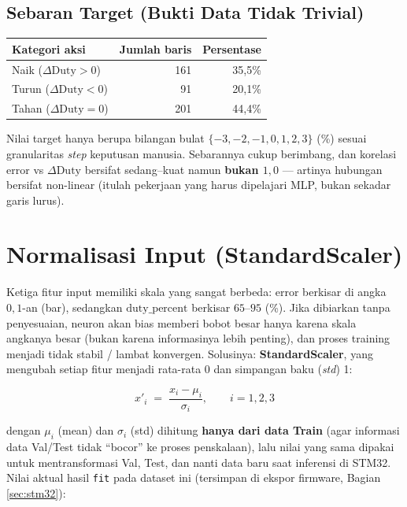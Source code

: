 \documentclass[11pt,a4paper]{article}
\begin{document}
\subsection{Sebaran Target (Bukti Data Tidak Trivial)}

\begin{center}
\begin{tabular}{@{}l r r@{}}
\toprule
\textbf{Kategori aksi} & \textbf{Jumlah baris} & \textbf{Persentase} \\
\midrule
Naik ($\Delta\mathrm{Duty} > 0$)  & 161 & 35,5\% \\
Turun ($\Delta\mathrm{Duty} < 0$) & 91  & 20,1\% \\
Tahan ($\Delta\mathrm{Duty} = 0$) & 201 & 44,4\% \\
\bottomrule
\end{tabular}
\end{center}

Nilai target hanya berupa bilangan bulat $\{-3,-2,-1,0,1,2,3\}$ (\%) sesuai granularitas
\emph{step} keputusan manusia. Sebarannya cukup berimbang, dan korelasi $\mathrm{error}$
vs $\Delta\mathrm{Duty}$ bersifat sedang--kuat namun \textbf{bukan $1{,}0$} --- artinya
hubungan bersifat non-linear (itulah pekerjaan yang harus dipelajari MLP, bukan sekadar
garis lurus).

\section{Normalisasi Input (StandardScaler)}
\label{sec:norm}

Ketiga fitur input memiliki skala yang sangat berbeda: $\mathrm{error}$ berkisar di angka
$0{,}1$-an (bar), sedangkan $\mathrm{duty\_percent}$ berkisar $65$--$95$ (\%). Jika
dibiarkan tanpa penyesuaian, neuron akan bias memberi bobot besar hanya karena skala
angkanya besar (bukan karena informasinya lebih penting), dan proses training menjadi
tidak stabil / lambat konvergen. Solusinya: \textbf{StandardScaler}, yang mengubah setiap
fitur menjadi rata-rata 0 dan simpangan baku (\emph{std}) 1:

\begin{formulabox}
\[
  x'_i \;=\; \frac{x_i - \mu_i}{\sigma_i}, \qquad i = 1,2,3
\]
\end{formulabox}

dengan $\mu_i$ (mean) dan $\sigma_i$ (std) dihitung \textbf{hanya dari data Train} (agar
informasi data Val/Test tidak ``bocor'' ke proses penskalaan), lalu nilai yang sama
dipakai untuk mentransformasi Val, Test, dan nanti data baru saat inferensi di STM32.
Nilai aktual hasil \texttt{fit} pada dataset ini (tersimpan di ekspor firmware, Bagian
\ref{sec:stm32}):
\end{document}
